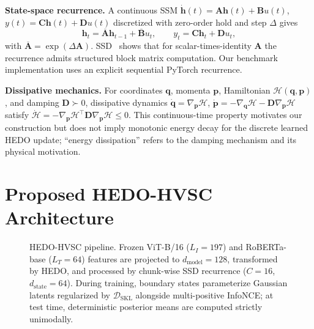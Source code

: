 \documentclass[runningheads,a4paper]{llncs}
\begin{document}
\textbf{State-space recurrence.} A continuous SSM $\dot{\mathbf{h}}(t) = \mathbf{A}\mathbf{h}(t) + \mathbf{B}u(t)$, $y(t) = \mathbf{C}\mathbf{h}(t) + \mathbf{D}u(t)$ discretized with zero-order hold and step $\Delta$ gives
\begin{equation}
\mathbf{h}_t = \overline{\mathbf{A}} \mathbf{h}_{t-1} + \overline{\mathbf{B}} u_t, \qquad y_t = \mathbf{C} \mathbf{h}_t + \mathbf{D} u_t,
\end{equation}
with $\overline{\mathbf{A}} = \exp(\Delta \mathbf{A})$. SSD~\cite{dao2024transformers} shows that for scalar-times-identity $\mathbf{A}$ the recurrence admits structured block matrix computation. Our benchmark implementation uses an explicit sequential PyTorch recurrence.

\textbf{Dissipative mechanics.} For coordinates $\mathbf{q}$, momenta $\mathbf{p}$, Hamiltonian $\mathcal{H}(\mathbf{q}, \mathbf{p})$, and damping $\mathbf{D} \succ 0$, dissipative dynamics $\dot{\mathbf{q}} = \nabla_{\mathbf{p}}\mathcal{H}$, $\dot{\mathbf{p}} = -\nabla_{\mathbf{q}}\mathcal{H} - \mathbf{D}\nabla_{\mathbf{p}}\mathcal{H}$ satisfy $\dot{\mathcal{H}} = -\nabla_{\mathbf{p}}\mathcal{H}^\top \mathbf{D} \nabla_{\mathbf{p}}\mathcal{H} \le 0$. This continuous-time property motivates our construction but does not imply monotonic energy decay for the discrete learned HEDO update; ``energy dissipation'' refers to the damping mechanism and its physical motivation.

\section{Proposed HEDO-HVSC Architecture}
\label{sec:methodology}

\begin{figure}[!htbp]
\centering
\resizebox{!}{0.6\textheight}{\HEDOArchitectureFigure}
\caption{HEDO-HVSC pipeline. Frozen ViT-B/16 ($L_I=197$) and RoBERTa-base ($L_T=64$) features are projected to $d_{\text{model}}=128$, transformed by HEDO, and processed by chunk-wise SSD recurrence ($C=16$, $d_{\text{state}}=64$). During training, boundary states parameterize Gaussian latents regularized by $\mathcal{D}_{\text{SKL}}$ alongside multi-positive InfoNCE; at test time, deterministic posterior means are computed strictly unimodally.}
\label{fig:overall_architecture}
\end{figure}
\end{document}
